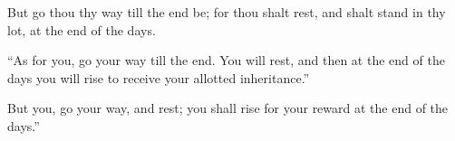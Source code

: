 			\begin{versebox}
					\item[BHS] 
					\item[LXX] 
					\item[ASV] But go thou thy way till the end be; for thou shalt rest, and shalt stand in thy lot, at the end of the days.
					\item[NIV] “As for you, go your way till the end. You will rest, and then at the end of the days you will rise to receive your allotted inheritance.”
					\item[NRSV] But you, go your way, and rest; you shall rise for your reward at the end of the days.”
			\end{versebox}
